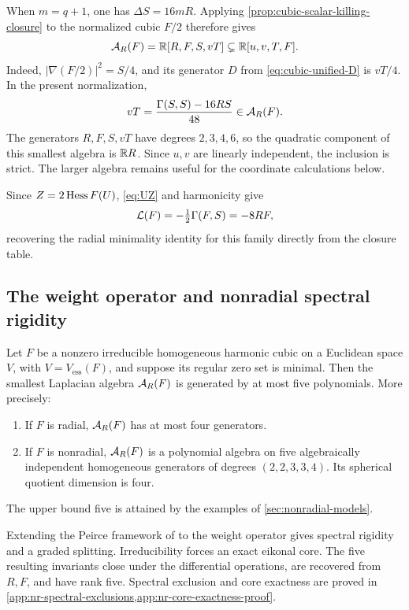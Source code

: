 When \(m=q+1\), one has $\Delta S=16mR$. Applying
\cref{prop:cubic-scalar-killing-closure} to the normalized cubic
$F/2$ therefore gives
\[
 \mathcal A_R(F)=\mathbb R[R,F,S,vT]\subsetneq\mathbb R[u,v,T,F].
\]
Indeed, $|\nabla(F/2)|^2=S/4$, and its generator $D$ from
\eqref{eq:cubic-unified-D} is $vT/4$. In the present normalization,
\[
 vT=\frac{\Gamma(S,S)-16RS}{48}\in\mathcal A_R(F).
\]
The generators $R,F,S,vT$ have degrees $2,3,4,6$, so the quadratic
component of this smallest algebra is $\mathbb R R$. Since $u,v$ are
linearly independent, the inclusion is strict. The larger algebra
remains useful for the coordinate calculations below.

Since \(Z=2\operatorname{Hess} F(U)\), \eqref{eq:UZ} and harmonicity give
\[
 \mathcal L(F)=-\tfrac12\Gamma(F,S)=-8RF,
\]
recovering the radial minimality identity for this family
directly from the closure table.


\subsection{The weight operator and nonradial spectral rigidity}
\label{sec:nonradial-cubics}
\label{sec:cubic-generator-bound}

\begin{theorem}
\label{thm:harmonic-cubic-five-bound}
Let $F$ be a nonzero irreducible homogeneous harmonic cubic on a
Euclidean space $V$, with $V=V_{\mathrm{ess}}(F)$, and suppose its
regular zero set is minimal.
Then the smallest Laplacian algebra $\mathcal A_R(F)$ is
generated by at most five polynomials. More precisely:
\begin{enumerate}[label=\textup{(\roman*)}]
\item If $F$ is radial, $\mathcal A_R(F)$ has at most four generators.
\item If $F$ is nonradial, $\mathcal A_R(F)$ is a polynomial algebra on five
algebraically independent homogeneous generators of degrees
$(2,2,3,3,4)$. Its spherical quotient dimension is four.
\end{enumerate}
The upper bound five is attained by the examples of
\cref{sec:nonradial-models}.
\end{theorem}

Extending the Peirce framework of
\cite[Sections~6.6--6.8]{NadirashviliTkachevVladut14} to the weight
operator gives spectral rigidity and a graded splitting. Irreducibility
forces an exact eikonal core. The five resulting invariants close under
the differential operations, are recovered from $R,F$, and have rank
five. Spectral exclusion and core exactness are proved in
\cref{app:nr-spectral-exclusions,app:nr-core-exactness-proof}.

